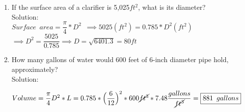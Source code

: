 \begin{enumerate}[1.]
\item If the surface area of a clarifier is 5,025$ft^2$, what is its diameter?\\
\vspace{0.3cm}
Solution:\\
\vspace{0.3cm}
$Surface \enspace area=\dfrac{\pi}{4}*D^2 \enspace \implies 5025(ft^2)=0.785*D^2 (ft^2)$\\
$\implies D^2=\dfrac{5025}{0.785} \implies D=\sqrt{6401.3}=\boxed{80ft}$
\vspace{0.3cm}

\item How many gallons of water would 600 feet of 6-inch diameter pipe hold, approximately?\\
\vspace{0.3cm}
Solution:\\

\vspace{0.3cm}
\vspace{0.3cm}
$Volume=\dfrac{\pi}{4}D^2*L=0.785*\Big(\dfrac{6}{12}\Big)^2*600\cancel{ft^3}*7.48\dfrac{gallons}{\cancel{ft^3}}=\boxed{881 \enspace gallons}$
\end{enumerate}
%
%
%
%

